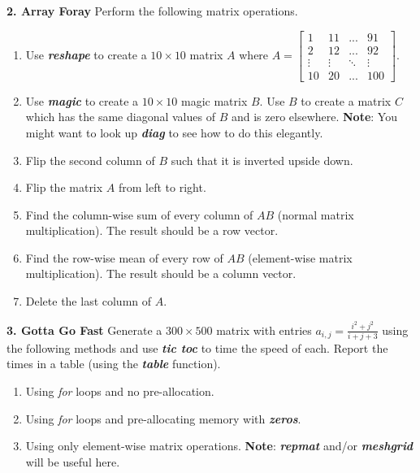 \documentclass[11pt]{article}
\newenvironment{qparts}{\begin{enumerate}[{(}a{)}]}{\end{enumerate}}
\begin{document}
\noindent
\newline
\textbf{2. Array Foray} Perform the following matrix operations. 
\begin{qparts}
    \item Use \textbf{\textit{reshape}} to create a $10 \times 10$ matrix $A$ where 
    $A = \begin{bmatrix}1 &11 & ...& 91\\ 2&12&...&92\\ \vdots&\vdots&\ddots&\vdots\\ 10&20&...&100\end{bmatrix}$.

    \item Use \textbf{\textit{magic}} to create a $10 \times 10$ magic matrix $B$. 
    Use $B$ to create a matrix $C$ which has the same diagonal values of $B$ and is zero elsewhere. 
    \textbf{Note}: You might want to look up \textbf{\textit{diag}} to see how to do this elegantly. 

    \item Flip the second column of $B$ such that it is inverted upside down.

    \item Flip the matrix $A$ from left to right.

    \item Find the column-wise sum of every column of $AB$ (normal matrix multiplication).
    The result should be a row vector.

    \item Find the row-wise mean of every row of $AB$ (element-wise matrix multiplication).
    The result should be a column vector.

    \item Delete the last column of $A$. 
\end{qparts}

\noindent
\newline
\textbf{3. Gotta Go Fast}
Generate a $300 \times 500$ matrix with entries $a_{i,j} = \frac{i^2+j^2}{i+j+3} $
using the following methods and use \textbf{\textit{tic toc}} to time the speed of each.
Report the times in a table (using the \textbf{\textit{table}} function).

\begin{qparts}
    \item Using \textit{for} loops and no pre-allocation.

    \item Using \textit{for} loops and pre-allocating memory with \textbf{\textit{zeros}}.

    \item Using only element-wise matrix operations.
    \textbf{Note}: \textbf{\textit{repmat}} and/or \textbf{\textit{meshgrid}} will be useful here. 
\end{qparts}
\end{document}
